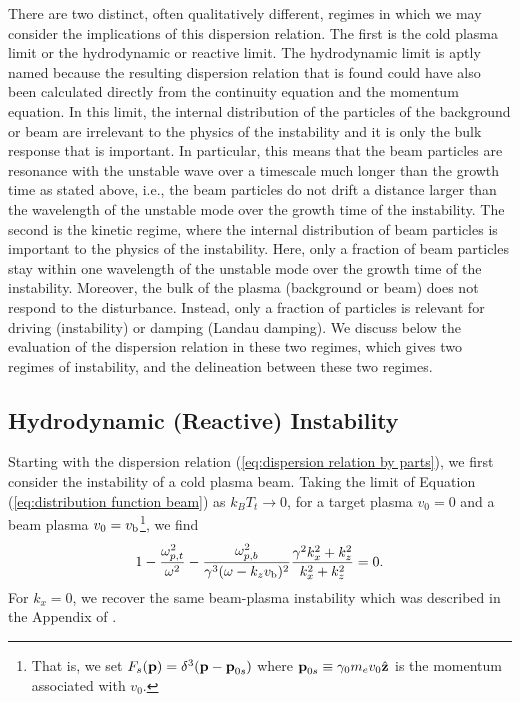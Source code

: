 \documentclass[usenatbib,iop,apj,numberedappendix]{aeb_emulateapj_2015}
\newcommand\bmath[1] {\mbox{\boldmath$\rm #1$}}
\newcommand{\vbeam}{\ensuremath{v_{\rm b}}}
\begin{document}
There are two distinct, often qualitatively different, regimes in which we may
consider the implications of this dispersion relation.  The first is the cold
plasma limit or the hydrodynamic or reactive limit.  The hydrodynamic limit is
aptly named because the resulting dispersion relation that is found could have
also been calculated directly from the continuity equation and the momentum
equation.  In this limit, the internal distribution of the particles of the
background or beam are irrelevant to the physics of the instability and it is
only the bulk response that is important.  In particular, this means that the
beam particles are resonance with the unstable wave over a timescale much longer
than the growth time as stated above, i.e., the beam particles
do not drift a distance larger than the wavelength of the unstable mode over the
growth time of the instability.  The second is the kinetic regime, where the
internal distribution of  beam particles is
important to the physics of the instability. Here, only a fraction of
 beam particles stay within one wavelength of the unstable mode
over the growth time of the instability.  Moreover, the bulk of
the plasma (background or beam) does not respond to the disturbance. Instead,
only a fraction of  particles is relevant for
driving (instability) or damping (Landau damping).  We discuss below the
evaluation of the dispersion relation in these two regimes, which gives two
regimes of instability, and the delineation between these two regimes.

\subsection{Hydrodynamic (Reactive) Instability}

Starting with the dispersion relation (\ref{eq:dispersion relation by parts}), we first consider the instability of a cold plasma beam. 
Taking the limit of Equation (\ref{eq:distribution function beam}) as $k_BT_t  \rightarrow 0$, for a target plasma $v_0=0$ and a beam plasma $v_0=\vbeam$\footnote{That is, we set $F_s(\bmath{p})=\delta^3(\bmath{p}-\bmath{p}_{0s})$ where $\bmath{p}_{0s}\equiv \gamma_0 m_e v_0 \hat{\bmath{z}}$ is the momentum associated with $v_0$.}, we find
\begin{equation}\label{eq:dispersion relation reactive}
 1 - \frac{\omega_{p,t}^2}{\omega^2} - \frac{\omega_{p,b}^2}{\gamma^3(\omega-k_z \vbeam)^2}\frac{\gamma^2 k_x^2 + k_z^2}{k_x^2 + k_z^2} = 0.
\end{equation}
For $k_x = 0$, we recover the same beam-plasma instability which was described in the Appendix of \citet{paperI}.  
\end{document}
